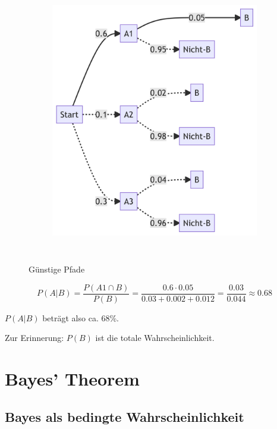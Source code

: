 \documentclass[
  a4paper,
  DIV=11]{scrreprt}
\theoremstyle{definition}
\theoremstyle{remark}
\begin{document}
\begin{figure}

{\centering 

\begin{figure}[H]

{\centering \includegraphics[width=4.11in,height=4.63in]{./Wskt_files/figure-latex/mermaid-figure-2.png}

}

\end{figure}

}

\caption{\label{fig-tot-wskt2}Günstige Pfade}

\end{figure}

\[P(A|B) = \frac{P(A1 \cap B)}{P(B)} = \frac{0.6 \cdot 0.05}{0.03 + 0.002 + 0.012} = \frac{0.03}{0.044} \approx 0.68\]

\(P(A|B)\) beträgt also ca. 68\%.

Zur Erinnerung: \(P(B)\) ist die totale Wahrscheinlichkeit.

\hypertarget{bayes-theorem}{%
\section{Bayes' Theorem}\label{bayes-theorem}}

\hypertarget{bayes-als-bedingte-wahrscheinlichkeit}{%
\subsection{Bayes als bedingte
Wahrscheinlichkeit}\label{bayes-als-bedingte-wahrscheinlichkeit}}
\end{document}
